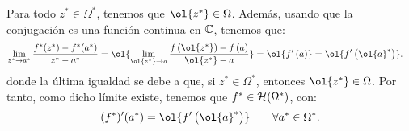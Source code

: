 \begin{ejercicio}
\begin{description}
        Para todo $z^*\in\Omega^*$, tenemos que $\ol{z^*}\in\Omega$. Además, usando que la conjugación es una función continua en $\mathbb{C}$, tenemos que:
        \begin{align*}
            \lim_{z^*\to a^*}\dfrac{f^*(z^*)-f^*(a^*)}{z^*-a^*}
            &= \ol{\lim_{\ol{z^*}\to a}\dfrac{f\left(\ol{z^*}\right)-f\left(a\right)}
            {\ol{z^*}-a}} = \ol{f'\left(a\right)} = \ol{f'\left(\ol{a}^*\right)}.
        \end{align*}
        donde la última igualdad se debe a que, si $z^*\in\Omega^*$, entonces $\ol{z^*}\in\Omega$. Por tanto, como dicho límite existe, tenemos que $f^*\in \mathcal{H}(\Omega^*)$, con:
        \[
            (f^*)'(a^*) = \ol{f'\left(\ol{a}^*\right)}\qquad \forall a^*\in\Omega^*.
        \]
    \end{description}
\end{ejercicio}

